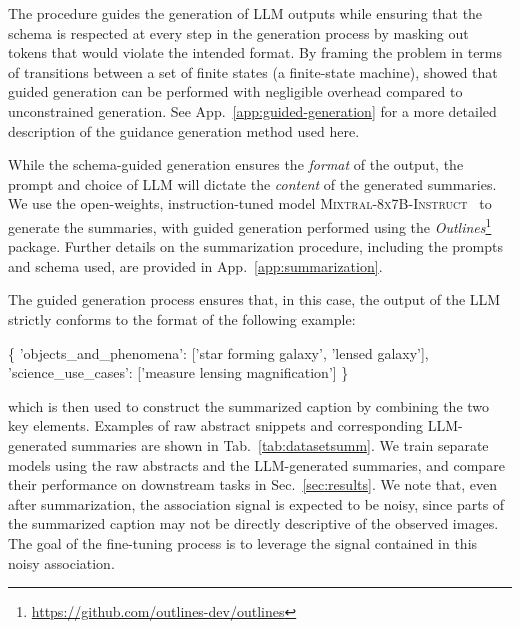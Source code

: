 \documentclass[10pt]{article} %
\newcommand{\package}[1]{\textsl{#1}\xspace}
\newcommand{\SM}[1]{\textcolor{blue}{[SM: #1]}}
\begin{document}
The procedure guides the generation of LLM outputs while ensuring that the schema is respected at every step in the generation process by masking out tokens that would violate the intended format.
%
By framing the problem in terms of transitions between a set of finite states (a finite-state machine), \cite{willard2023efficient} showed that guided generation can be performed with negligible overhead compared to unconstrained generation.
%
See App.~\ref{app:guided-generation} for a more detailed description of the guidance generation method used here.

While the schema-guided generation ensures the \emph{format} of the output, the prompt and choice of LLM will dictate the \emph{content} of the generated summaries.
%
We use the open-weights, instruction-tuned model \textsc{Mixtral-8x7B-Instruct}~\citep{jiang2024mixtral} to generate the summaries, with guided generation performed using the \package{Outlines}\footnote{\url{https://github.com/outlines-dev/outlines}} package.
%
Further details on the summarization procedure, including the prompts and schema used, are provided in App.~\ref{app:summarization}.


The guided generation process ensures that, in this case, the output of the LLM strictly conforms to the format of the following example:
\begin{center}
  \begin{jsoncode}
    \centering
          \color{black}\{
            \color{codegreen}'objects_and_phenomena'\color{black}: [\color{codegreen}'star forming galaxy', 'lensed galaxy'\color{black}], 
            \color{codegreen}'science_use_cases'\color{black}: [\color{codegreen}'measure lensing magnification'\color{black}]
          \color{black}\}
  \end{jsoncode}
  \end{center}
which is then used to construct the summarized caption by combining the two key elements.
%
Examples of raw abstract snippets and corresponding LLM-generated summaries are shown in Tab.~\ref{tab:datasetsumm}.
%
%
We train separate models using the raw abstracts and the LLM-generated summaries, and compare their performance on downstream tasks in Sec.~\ref{sec:results}.
%
We note that, even after summarization, the association signal is expected to be noisy, since parts of the summarized caption may not be directly descriptive of the observed images. The goal of the fine-tuning process is to leverage the signal contained in this noisy association.
\end{document}

